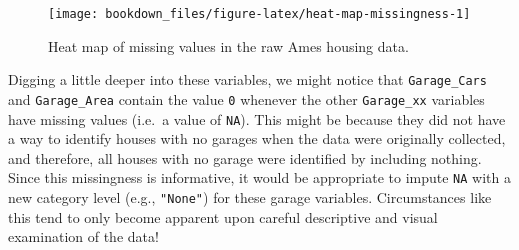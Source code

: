 \documentclass[]{krantz}
\makeatletter
\newenvironment{Shaded}{\begin{snugshade}}{\end{snugshade}}
\newcommand{\DataTypeTok}[1]{\textcolor[rgb]{0.27,0.27,0.27}{#1}}
\newcommand{\DecValTok}[1]{\textcolor[rgb]{0.06,0.06,0.06}{#1}}
\newcommand{\KeywordTok}[1]{\textcolor[rgb]{0.27,0.27,0.27}{\textbf{#1}}}
\newcommand{\NormalTok}[1]{#1}
\newcommand{\OperatorTok}[1]{\textcolor[rgb]{0.43,0.43,0.43}{\textbf{#1}}}
\newcommand{\OtherTok}[1]{\textcolor[rgb]{0.37,0.37,0.37}{#1}}
\newcommand{\StringTok}[1]{\textcolor[rgb]{0.5,0.5,0.5}{#1}}
\newenvironment{kframe}{%
\medskip{}
\setlength{\fboxsep}{.8em}
 \def\at@end@of@kframe{}%
 \ifinner\ifhmode%
  \def\at@end@of@kframe{\end{minipage}}%
  \begin{minipage}{\columnwidth}%
 \fi\fi%
 \def\FrameCommand##1{\hskip\@totalleftmargin \hskip-\fboxsep
 \colorbox{shadecolor}{##1}\hskip-\fboxsep
     \hskip-\linewidth \hskip-\@totalleftmargin \hskip\columnwidth}%
 \MakeFramed {\advance\hsize-\width
   \@totalleftmargin\z@ \linewidth\hsize
   \@setminipage}}%
 {\par\unskip\endMakeFramed%
 \at@end@of@kframe}
\renewenvironment{Shaded}{\begin{kframe}}{\end{kframe}}
\makeatother
\begin{document}
\begin{Shaded}
\end{Shaded}

\begin{figure}

{\centering \texttt{[image: bookdown\_files/figure-latex/heat-map-missingness-1]} 

}

\caption{Heat map of missing values in the raw Ames housing data.}\label{fig:heat-map-missingness}
\end{figure}

Digging a little deeper into these variables, we might notice that \texttt{Garage\_Cars} and \texttt{Garage\_Area} contain the value \texttt{0} whenever the other \texttt{Garage\_xx} variables have missing values (i.e.~a value of \texttt{NA}). This might be because they did not have a way to identify houses with no garages when the data were originally collected, and therefore, all houses with no garage were identified by including nothing. Since this missingness is informative, it would be appropriate to impute \texttt{NA} with a new category level (e.g., \texttt{"None"}) for these garage variables. Circumstances like this tend to only become apparent upon careful descriptive and visual examination of the data!
\end{document}
